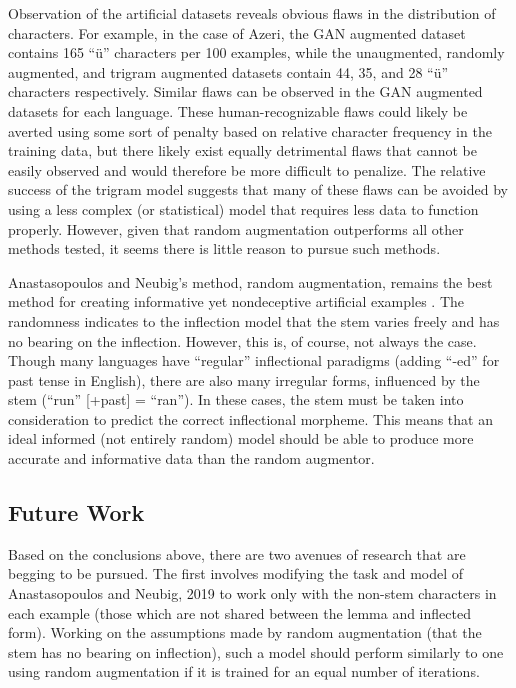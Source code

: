 \documentclass{article}
\begin{document}
      Observation of the artificial datasets reveals obvious flaws in the distribution of characters. For example, in the case of Azeri, the GAN augmented dataset contains 165 ``ü'' characters per 100 examples, while the unaugmented, randomly augmented, and trigram augmented datasets contain 44, 35, and 28 ``ü'' characters respectively. Similar flaws can be observed in the GAN augmented datasets for each language. These human-recognizable flaws could likely be averted using some sort of penalty based on relative character frequency in the training data, but there likely exist equally detrimental flaws that cannot be easily observed and would therefore be more difficult to penalize. The relative success of the trigram model suggests that many of these flaws can be avoided by using a less complex (or statistical) model that requires less data to function properly. However, given that random augmentation outperforms all other methods tested, it seems there is little reason to pursue such methods.

      Anastasopoulos and Neubig's method, random augmentation, remains the best method for creating informative yet nondeceptive artificial examples \cite{CMU}. The randomness indicates to the inflection model that the stem varies freely and has no bearing on the inflection. However, this is, of course, not always the case. Though many languages have ``regular'' inflectional paradigms (adding ``-ed'' for past tense in English), there are also many irregular forms, influenced by the stem (``run'' [+past] = ``ran''). In these cases, the stem must be taken into consideration to predict the correct inflectional morpheme. This means that an ideal informed (not entirely random) model should be able to produce more accurate and informative data than the random augmentor.

    \subsection{Future Work}
      Based on the conclusions above, there are two avenues of research that are begging to be pursued. The first involves modifying the task and model of Anastasopoulos and Neubig, 2019 \cite{CMU} to work only with the non-stem characters in each example (those which are not shared between the lemma and inflected form). Working on the assumptions made by random augmentation (that the stem has no bearing on inflection), such a model should perform similarly to one using random augmentation if it is trained for an equal number of iterations.
      
\end{document}
